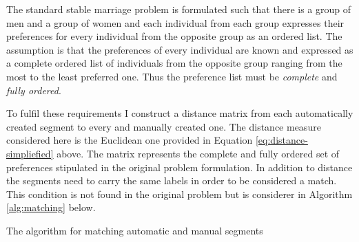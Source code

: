 The standard stable marriage problem is formulated such that there is a group of men and a group of women and each individual from each group expresses their preferences for every individual from the opposite group as an ordered list. The assumption is that the preferences of every individual are known and expressed as a complete ordered list of individuals from the opposite group ranging from the most to the least preferred one. Thus the preference list must be \textit{complete} and \textit{fully ordered}. 

To fulfil these requirements I construct a distance matrix from each automatically created segment to every and manually created one. The distance measure considered here is the Euclidean one provided in Equation \ref{eq:distance-simpliefied} above. The matrix represents the complete and fully ordered set of preferences stipulated in the original problem formulation. In addition to distance the segments need to carry the same labels in order to be considered a match. This condition is not found in the original problem but is considerer in Algorithm \ref{alg:matching} below.



\begin{algorithm}[!ht]
    \Input{\aslist, \mslist} %
    \caption{The algorithm for matching automatic and manual segments}
    \label{alg:matching}
\end{algorithm}

